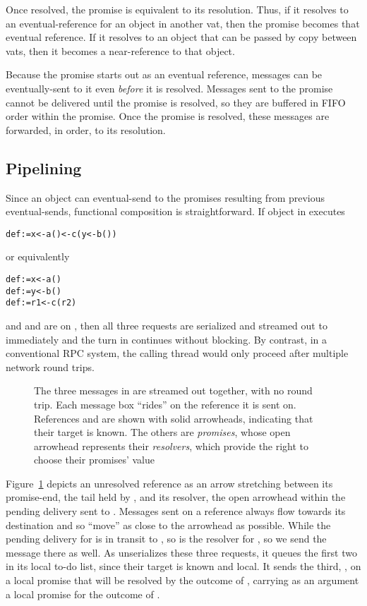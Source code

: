 \documentclass{llncs}
\begin{document}
Once resolved, the promise is equivalent to its resolution. Thus, if
it resolves to an eventual-reference for an object in another vat,
then the promise becomes that eventual reference. If it resolves to
an object that can be passed by copy between vats, then it becomes a
near-reference to that object.

Because the promise starts out as an eventual reference, messages can
be eventually-sent to it even \emph{before} it is resolved. Messages
sent to the promise cannot be delivered until the promise is resolved,
so they are buffered in FIFO order within the promise. Once the
promise is resolved, these messages are forwarded, in order, to its
resolution.

\subsection{Pipelining}

Since an object can eventual-send to the promises resulting from
previous eventual-sends, functional composition is
straightforward. If object  in  executes
%
\begin{alltt}
    def  := x <- a() <- c(y <- b())
\end{alltt}
%
or equivalently
%
\begin{alltt}
    def  := x <- a()
    def  := y <- b()
    def  := r1 <- c(r2)
\end{alltt}
%
and  and  are on , then all three requests are
serialized and streamed out to  immediately and the turn in
 continues without blocking. By contrast, in a conventional RPC
system, the calling thread would only proceed after multiple network
round trips.

\begin{figure}
\centerline{}
\caption{The three messages in  are streamed out together, with no round
trip. Each message box ``rides'' on the reference it is sent
on. References  and  are shown with solid arrowheads,
indicating that their target is known. The others are \emph{promises},
whose open arrowhead represents their \emph{resolvers}, which provide
the right to choose their promises' value}
\label{fig:pipeline}
\end{figure}

Figure~\ref{fig:pipeline} depicts an unresolved reference as an arrow
stretching between its promise-end, the tail held by , and its
resolver, the open arrowhead within the pending delivery sent to
. Messages sent on a reference always flow towards its
destination and so ``move'' as close to the arrowhead as
possible. While the pending delivery for  is in transit to
, so is the resolver for , so we send the 
message there as well. As  unserializes these three requests,
it queues the first two in its local to-do list, since their target is
known and local. It sends the third, , on a local
promise that will be resolved by the outcome of , carrying
as an argument a local promise for the outcome of .
\end{document}
